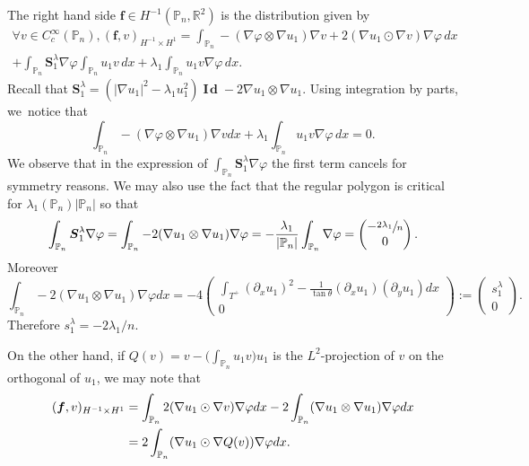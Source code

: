 \documentclass[JEP,XML,SOM,Unicode,ThmDefs,NoFloatCountersInSection,published]{cedram}
\theoremstyle{plain}
\theoremstyle{definition}
\newcommand{\bo}[1]{{\boldsymbol#1}}
\newcommand{\Id}{\operatorname{{\bo I\!\bo d}}}
\let\Bbb\mathbb
\def\R{\mathbb{R}}
\def\Pp{{\mathbb{P}_n}}
\begin{document}
The right hand side $\bo f \in H^{-1} (\Pp, \R^2)$ is the distribution given by
\vspace*{-5pt}
\begin{multline*}
\forall v \in C_c^\infty (\Pp), (\bo f,v)_{H^{-1}\times H^1} = \int_{\Pp} -(\nabla \varphi\otimes \nabla u_1)\nabla v+2(\nabla u_1 \odot \nabla v)\nabla \varphi \, dx\\
+\int_{\Pp} \bo S_1^\lambda \nabla \varphi \int_{\Pp} u_1v\, dx + \lambda_1\int_{\Pp} u_1v \nabla \varphi\, dx.
\end{multline*}
Recall that $\bo S_1^\lambda = (|\nabla u_1|^2 -\lambda_1 u_1^2)\Id -2\nabla u_1 \otimes \nabla u_1$. Using integration by parts, we~notice that
\[
\int_{\Pp} -(\nabla \varphi\otimes \nabla u_1)\nabla vdx+ \lambda_1 \int_{\Pp} u_1v \nabla \varphi\, dx=0.
\]
We observe that
in the expression of $\int_{\Pp} \bo S_1^\lambda \nabla \varphi $ the first term cancels for symmetry reasons. We may also use the fact that the regular polygon is critical for $\lambda_1(\Pp)|\Pp|$ so that
\[
\int_{\Pp} \bo S_1^\lambda \nabla \varphi = \int_{\Pp} -2(\nabla u_1 \otimes \nabla u_1) \nabla \varphi = -\frac{\lambda_1}{|\Pp|} \int_{\Pp} \nabla \varphi = \begin{pmatrix}
-\sfrac{2\lambda_1}{n} \\ 0
\end{pmatrix}.
\]
Moreover
\[
\int_{\Pp}-2 (\nabla u_1 \otimes \nabla u_1) \nabla \varphi dx = -4\begin{pmatrix} \displaystyle \int_{T^+ } (\partial_x u_1)^2 - \frac{1}{\tan \theta} (\partial_x u_1)(\partial_y u_1)dx\\0 \end{pmatrix}:= \begin{pmatrix} s_1^\lambda \\ 0\end{pmatrix}.
\]
Therefore $s_1^\lambda = -2\lambda_1/n$.

On the other hand, if $Q(v) = v-\bigl(\int_{\Pp} u_1v \bigr)u_1$ is the $L^2$-projection of $v$ on the orthogonal of $u_1$, we may note that
\begin{align}\label{eq:f-with-Q}
(\bo f,v)_{H^{-1}\times H^1} & = \int_{\Bbb P_n}2(\nabla u_1\odot \nabla v)\nabla \varphi dx - 2 \int_{\Bbb P_n} (\nabla u_1\otimes \nabla u_1)\nabla \varphi dx \\
& = 2\int_{\Bbb P_n} (\nabla u_1 \odot \nabla Q(v))\nabla \varphi dx. \notag
\end{align}
\end{document}
